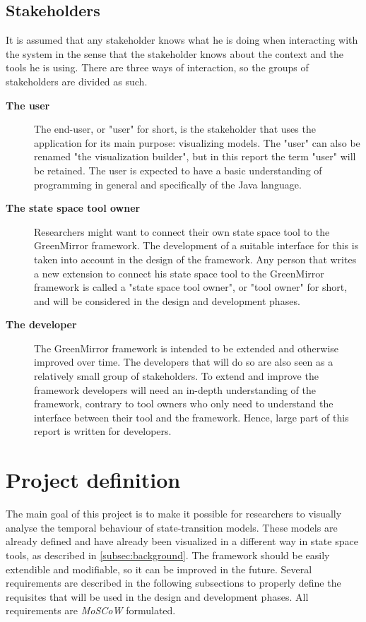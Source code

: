 \documentclass[a4paper]{article}
\begin{document}
\subsection{Stakeholders}
\label{subsec:stakeholders}
It is assumed that any stakeholder knows what he is doing when interacting with the system in the sense that the stakeholder knows about the context and the tools he is using. There are three ways of interaction, so the groups of stakeholders are divided as such.
\begin{description}
\item[\textbf{The user}] The end-user, or "user" for short, is the stakeholder that uses the application for its main purpose: visualizing models. The "user" can also be renamed "the visualization builder", but in this report the term "user" will be retained. The user is expected to have a basic understanding of programming in general and specifically of the Java language.
\item[\textbf{The state space tool owner}] Researchers might want to connect their own state space tool to the GreenMirror framework. The development of a suitable interface for this is taken into account in the design of the framework. Any person that writes a new extension to connect his state space tool to the GreenMirror framework is called a "state space tool owner", or "tool owner" for short, and will be considered in the design and development phases.
\item[\textbf{The developer}] The GreenMirror framework is intended to be extended and otherwise improved over time. The developers that will do so are also seen as a relatively small group of stakeholders. To extend and improve the framework developers will need an in-depth understanding of the framework, contrary to tool owners who only need to understand the interface between their tool and the framework. Hence, large part of this report is written for developers.
\end{description}









\section{Project definition}\label{sec:projectdefinition}
The main goal of this project is to make it possible for researchers to visually analyse the temporal behaviour of state-transition models. These models are already defined and have already been visualized in a different way in state space tools, as described in {\cref{subsec:background}}. The framework should be easily extendible and modifiable, so it can be improved in the future. Several requirements are described in the following subsections to properly define the requisites that will be used in the design and development phases. All requirements are \emph{MoSCoW} formulated.
\end{document}
